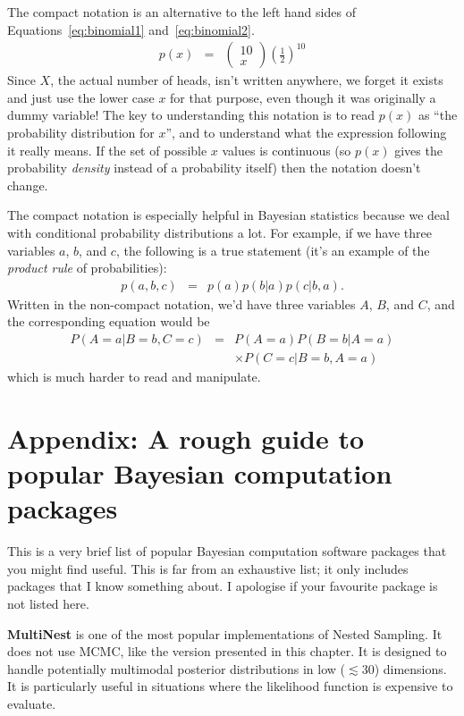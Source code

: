 The compact notation is an alternative to the left hand sides of
Equations~\ref{eq:binomial1} and~\ref{eq:binomial2}.
\begin{eqnarray}
p(x) &=& \left(\begin{array}{cc}10\\ x\end{array}\right)
\left(\frac{1}{2}\right)^{10}
\end{eqnarray}
Since $X$, the actual number of heads, isn't written anywhere, we forget it
exists and just use the lower case $x$ for that purpose, even though it was
originally a dummy variable!
The key to understanding this notation is to read $p(x)$ as ``the probability
distribution for $x$'', and to understand what the expression following it
really means. If the set of possible $x$ values is continuous (so $p(x)$ gives
the probability {\it density} instead of a probability itself) then the
notation doesn't change.

The compact notation is especially helpful in Bayesian statistics because
we deal with conditional probability distributions a lot. For example, if we
have three variables $a$, $b$, and $c$, the following is a true statement
(it's an example of the {\it product rule} of probabilities):
\begin{eqnarray}
p(a, b, c) &=& p(a)p(b|a)p(c|b,a).
\end{eqnarray}
Written in the non-compact notation, we'd have three variables $A$, $B$, and
$C$, and the corresponding equation would be
\begin{eqnarray}
P(A=a | B=b, C=c) &=&
 P(A=a)P(B=b|A=a)\\
& & \times P(C=c|B=b,A=a)
\end{eqnarray}
which is much harder to read and manipulate.

\section{Appendix: A rough guide to popular Bayesian computation packages}
This is a very brief list of popular Bayesian computation software packages
that you might find useful. This is far from an exhaustive list; it only
includes packages that I know something about. I apologise if your favourite
package is not listed here.

{\bf MultiNest} \citep{multinest} is one of the most popular implementations of
Nested Sampling. It does not use MCMC, like the version presented in this
chapter. It is designed to handle potentially multimodal posterior
distributions in low ($\lesssim 30$) dimensions. It is particularly useful in
situations where the likelihood function is expensive to evaluate.

